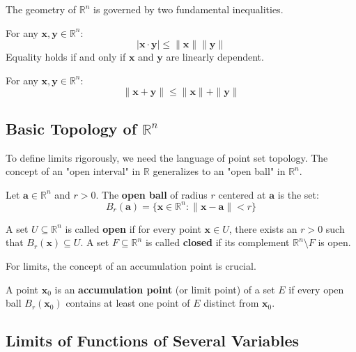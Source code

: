 The geometry of $\mathbb{R}^n$ is governed by two fundamental inequalities.

\begin{theorem}
For any $\mathbf{x}, \mathbf{y} \in \mathbb{R}^n$:
\[ |\mathbf{x} \cdot \mathbf{y}| \le \|\mathbf{x}\| \|\mathbf{y}\| \]
Equality holds if and only if $\mathbf{x}$ and $\mathbf{y}$ are linearly dependent.
\end{theorem}

\begin{theorem}
For any $\mathbf{x}, \mathbf{y} \in \mathbb{R}^n$:
\[ \|\mathbf{x} + \mathbf{y}\| \le \|\mathbf{x}\| + \|\mathbf{y}\| \]
\end{theorem}

\subsection{Basic Topology of $\mathbb{R}^n$}

To define limits rigorously, we need the language of point set topology. The concept of an "open interval" in $\mathbb{R}$ generalizes to an "open ball" in $\mathbb{R}^n$.

\begin{definition}
Let $\mathbf{a} \in \mathbb{R}^n$ and $r > 0$. The \textbf{open ball} of radius $r$ centered at $\mathbf{a}$ is the set:
\[ B_r(\mathbf{a}) = \{ \mathbf{x} \in \mathbb{R}^n : \|\mathbf{x} - \mathbf{a}\| < r \} \]
\end{definition}

\begin{definition}
A set $U \subseteq \mathbb{R}^n$ is called \textbf{open} if for every point $\mathbf{x} \in U$, there exists an $r > 0$ such that $B_r(\mathbf{x}) \subseteq U$.
A set $F \subseteq \mathbb{R}^n$ is called \textbf{closed} if its complement $\mathbb{R}^n \setminus F$ is open.
\end{definition}

For limits, the concept of an accumulation point is crucial.

\begin{definition}
A point $\mathbf{x}_0$ is an \textbf{accumulation point} (or limit point) of a set $E$ if every open ball $B_r(\mathbf{x}_0)$ contains at least one point of $E$ distinct from $\mathbf{x}_0$.
\end{definition}

\subsection{Limits of Functions of Several Variables}

